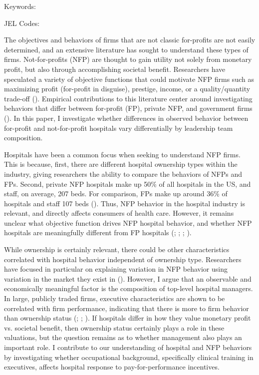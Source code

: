 \documentclass[12pt]{article}
\begin{document}
	
	
	
	\vspace{0.8in}
	
	\noindent Keywords: 
	
	\noindent JEL Codes: 
	
	\onehalfspacing
	
	\newpage

  The objectives and behaviors of firms that are not classic for-profits are not easily determined, and an extensive literature has sought to understand these types of firms. Not-for-profits (NFP) are thought to gain utility not solely from monetary profit, but also through accomplishing societal benefit. Researchers have speculated a variety of objective functions that could motivate NFP firms such as maximizing profit (for-profit in disguise), prestige, income, or a quality/quantity trade-off (\cite{steinberg1986revealed}). Empirical contributions to this literature center around investigating behaviors that differ between for-profit (FP), private NFP, and government firms (\cite{sloan2000not}). In this paper, I investigate whether differences in observed behavior between for-profit and not-for-profit hospitals vary differentially by leadership team composition. 
  
  Hospitals have been a common focus when seeking to understand NFP firms. This is because, first, there are different hospital ownership types within the industry, giving researchers the ability to compare the behaviors of NFPs and FPs. Second, private NFP hospitals make up 50\% of all hospitals in the US, and staff, on average, 207 beds. For comparison, FPs make up around 36\% of hospitals and staff 107 beds (\cite{ASPE_2023}). Thus, NFP behavior in the hospital industry is relevant, and directly affects consumers of health care. However, it remains unclear what objective function drives NFP hospital behavior, and whether NFP hospitals are meaningfully different from FP hospitals (\cite{sloan2000not}; \cite{erus2002inferring}; \cite{deneffe2002not}; \cite{horwitz2009hospital}). 
  
  While ownership is certainly relevant, there could be other characteristics correlated with hospital behavior independent of ownership type. Researchers have focused in particular on explaining variation in NFP behavior using variation in the market they exist in (\cite{horwitz2009hospital}). However, I argue that an observable and economically meaningful factor is the composition of top-level hospital managers. In large, publicly traded firms, executive characteristics are shown to be correlated with firm performance, indicating that there is more to firm behavior than ownership status (\cite{bertrand2003managing}; \cite{matsa2013female}; \cite{ahern2012changing}). If hospitals differ in how they value monetary profit vs. societal benefit, then ownership status certainly plays a role in these valuations, but the question remains as to whether management also plays an important role. I contribute to our understanding of hospital and NFP behaviors by investigating whether occupational background, specifically clinical training in executives, affects hospital response to pay-for-performance incentives.
\end{document}
